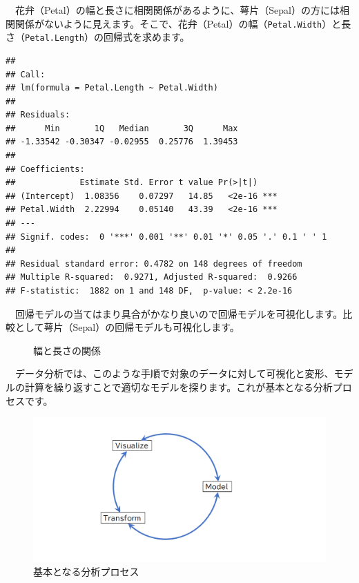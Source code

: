 \documentclass[
  12pt,
]{book}
\begin{document}
　花弁（Petal）の幅と長さに相関関係があるように、萼片（Sepal）の方には相関関係がないように見えます。そこで、花弁（Petal）の幅（\texttt{Petal.Width}）と長さ（\texttt{Petal.Length}）の回帰式を求めます。

\begin{verbatim}
## 
## Call:
## lm(formula = Petal.Length ~ Petal.Width)
## 
## Residuals:
##      Min       1Q   Median       3Q      Max 
## -1.33542 -0.30347 -0.02955  0.25776  1.39453 
## 
## Coefficients:
##             Estimate Std. Error t value Pr(>|t|)    
## (Intercept)  1.08356    0.07297   14.85   <2e-16 ***
## Petal.Width  2.22994    0.05140   43.39   <2e-16 ***
## ---
## Signif. codes:  0 '***' 0.001 '**' 0.01 '*' 0.05 '.' 0.1 ' ' 1
## 
## Residual standard error: 0.4782 on 148 degrees of freedom
## Multiple R-squared:  0.9271, Adjusted R-squared:  0.9266 
## F-statistic:  1882 on 1 and 148 DF,  p-value: < 2.2e-16
\end{verbatim}

　回帰モデルの当てはまり具合がかなり良いので回帰モデルを可視化します。比較として萼片（Sepal）の回帰モデルも可視化します。

\begin{figure}[H]

{\centering {}

}

\caption{幅と長さの関係}\label{fig:unnamed-chunk-9}
\end{figure}

　データ分析では、このような手順で対象のデータに対して可視化と変形、モデルの計算を繰り返すことで適切なモデルを探ります。これが基本となる分析プロセスです。

\begin{figure}[H]

{\centering \includegraphics[width=0.85\linewidth,]{./fig/DSWF/data_science_workflow_step1} 

}

\caption{基本となる分析プロセス}\label{fig:unnamed-chunk-10}
\end{figure}
\end{document}
